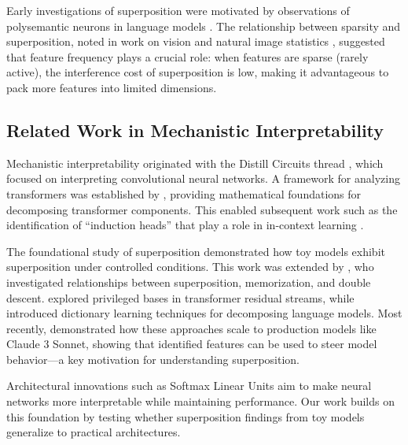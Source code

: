 Early investigations of superposition were motivated by observations of polysemantic neurons in language models \citep{olah2020zoom}. The relationship between sparsity and superposition, noted in work on vision and natural image statistics \citep{olshausen1997sparse}, suggested that feature frequency plays a crucial role: when features are sparse (rarely active), the interference cost of superposition is low, making it advantageous to pack more features into limited dimensions.

\subsection{Related Work in Mechanistic Interpretability}

Mechanistic interpretability originated with the Distill Circuits thread \citep{cammarata2020thread}, which focused on interpreting convolutional neural networks. A framework for analyzing transformers was established by \citet{elhage2021mathematical}, providing mathematical foundations for decomposing transformer components. This enabled subsequent work such as the identification of ``induction heads'' that play a role in in-context learning \citep{olsson2022context}.

The foundational study of superposition \citep{elhage2022toy} demonstrated how toy models exhibit superposition under controlled conditions. This work was extended by \citet{henighan2023superposition}, who investigated relationships between superposition, memorization, and double descent. \citet{hubinger2023privileged} explored privileged bases in transformer residual streams, while \citet{bricken2023monosemanticity} introduced dictionary learning techniques for decomposing language models. Most recently, \citet{templeton2024scaling} demonstrated how these approaches scale to production models like Claude 3 Sonnet, showing that identified features can be used to steer model behavior---a key motivation for understanding superposition.

Architectural innovations such as Softmax Linear Units \citep{elhage2022softmax} aim to make neural networks more interpretable while maintaining performance. Our work builds on this foundation by testing whether superposition findings from toy models generalize to practical architectures.
